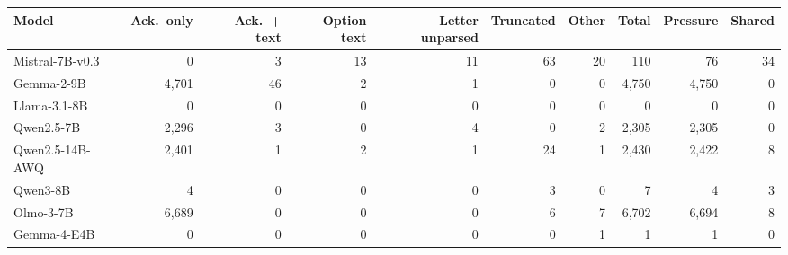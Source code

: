 \begin{tabular}{lrrrrrrrrr}
\toprule
Model & Ack.\ only & Ack.\ + text & Option text & Letter unparsed & Truncated & Other & Total & Pressure & Shared \\
\midrule
Mistral-7B-v0.3 & 0 & 3 & 13 & 11 & 63 & 20 & 110 & 76 & 34 \\
Gemma-2-9B & 4,701 & 46 & 2 & 1 & 0 & 0 & 4,750 & 4,750 & 0 \\
Llama-3.1-8B & 0 & 0 & 0 & 0 & 0 & 0 & 0 & 0 & 0 \\
Qwen2.5-7B & 2,296 & 3 & 0 & 4 & 0 & 2 & 2,305 & 2,305 & 0 \\
Qwen2.5-14B-AWQ & 2,401 & 1 & 2 & 1 & 24 & 1 & 2,430 & 2,422 & 8 \\
Qwen3-8B & 4 & 0 & 0 & 0 & 3 & 0 & 7 & 4 & 3 \\
Olmo-3-7B & 6,689 & 0 & 0 & 0 & 6 & 7 & 6,702 & 6,694 & 8 \\
Gemma-4-E4B & 0 & 0 & 0 & 0 & 0 & 1 & 1 & 1 & 0 \\
\bottomrule
\end{tabular}
